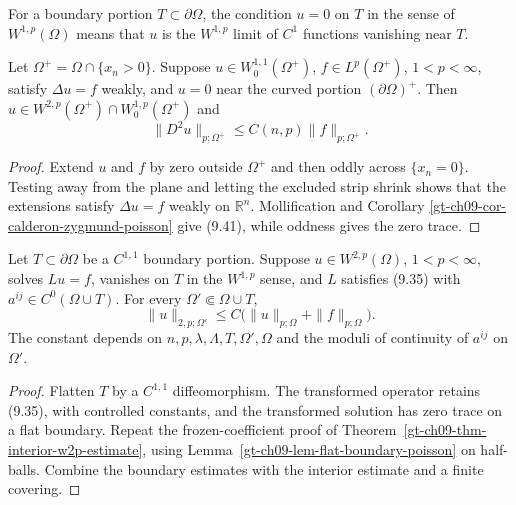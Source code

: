 For a boundary portion $T\subset\partial\Omega$, the condition $u=0$ on
$T$ in the sense of $W^{1,p}(\Omega)$ means that $u$ is the
$W^{1,p}$ limit of $C^1$ functions vanishing near $T$.

\begin{lemma}
\label{gt-ch09-lem-flat-boundary-poisson}
Let $\Omega^+=\Omega\cap\{x_n>0\}$.  Suppose
$u\in W^{1,1}_0(\Omega^+)$, $f\in L^p(\Omega^+)$, $1<p<\infty$, satisfy
$\Delta u=f$ weakly, and $u=0$ near the curved portion
$(\partial\Omega)^+$.  Then
$u\in W^{2,p}(\Omega^+)\cap W^{1,p}_0(\Omega^+)$ and
\begin{equation}\tag{9.41}
\|D^2u\|_{p;\Omega^+}\le C(n,p)\|f\|_{p;\Omega^+}.
\end{equation}
\end{lemma}
\begin{proof}
\sketch Extend $u$ and $f$ by zero outside $\Omega^+$ and then oddly across
$\{x_n=0\}$.  Testing away from the plane and letting the excluded strip
shrink shows that the extensions satisfy $\Delta u=f$ weakly on
$\mathbb R^n$.  Mollification and Corollary
\ref{gt-ch09-cor-calderon-zygmund-poisson} give (9.41), while oddness gives
the zero trace.
\end{proof}

\begin{theorem}
\label{gt-ch09-thm-local-boundary-w2p-estimate}
Let $T\subset\partial\Omega$ be a $C^{1,1}$ boundary portion.  Suppose
$u\in W^{2,p}(\Omega)$, $1<p<\infty$, solves $Lu=f$, vanishes on $T$ in
the $W^{1,p}$ sense, and $L$ satisfies (9.35) with
$a^{ij}\in C^0(\Omega\cup T)$.  For every
$\Omega'\Subset\Omega\cup T$,
\begin{equation}\tag{9.42}
\|u\|_{2,p;\Omega'}\le
C\bigl(\|u\|_{p;\Omega}+\|f\|_{p;\Omega}\bigr).
\end{equation}
The constant depends on $n,p,\lambda,\Lambda,T,\Omega',\Omega$ and the
moduli of continuity of $a^{ij}$ on $\Omega'$.
\end{theorem}
\begin{proof}
\sketch Flatten $T$ by a $C^{1,1}$ diffeomorphism.  The transformed operator
retains (9.35), with controlled constants, and the transformed solution has
zero trace on a flat boundary.  Repeat the frozen-coefficient proof of
Theorem~\ref{gt-ch09-thm-interior-w2p-estimate}, using
Lemma~\ref{gt-ch09-lem-flat-boundary-poisson} on half-balls.  Combine the
boundary estimates with the interior estimate and a finite covering.
\end{proof}

